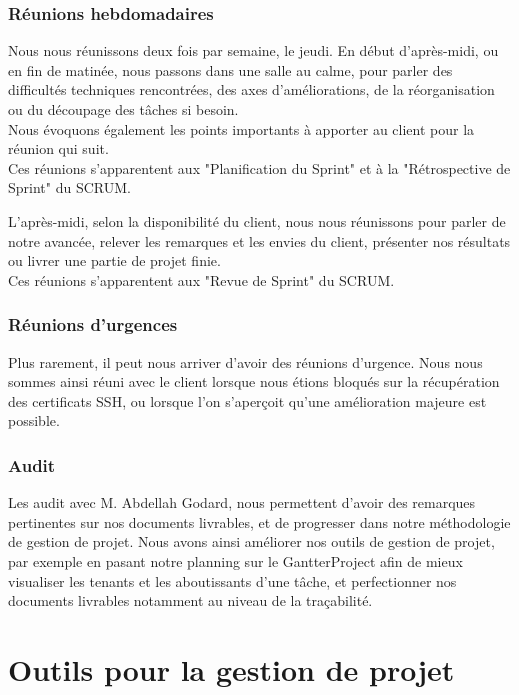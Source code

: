 \subsubsection{Réunions hebdomadaires}

Nous nous réunissons deux fois par semaine, le jeudi.
En début d'après-midi, ou en fin de matinée, nous passons dans une salle au calme, pour parler des difficultés techniques rencontrées, des axes d'améliorations, de la réorganisation ou du découpage des tâches si besoin.\\
Nous évoquons également les points importants à apporter au client pour la réunion qui suit.\\
Ces réunions s'apparentent aux "Planification du Sprint" et à la "Rétrospective de Sprint" du SCRUM.

L'après-midi, selon la disponibilité du client, nous nous réunissons pour parler de notre avancée, relever les remarques et les envies du client, présenter nos résultats ou livrer une partie de projet finie.\\
Ces réunions s'apparentent aux "Revue de Sprint" du SCRUM.

\subsubsection{Réunions d'urgences}

Plus rarement, il peut nous arriver d'avoir des réunions d'urgence. Nous nous sommes ainsi réuni avec le client lorsque nous étions bloqués sur la récupération des certificats SSH, ou lorsque l'on s'aperçoit qu'une amélioration majeure est possible.

\subsubsection{Audit}

Les audit avec M. Abdellah Godard, nous permettent d'avoir des remarques pertinentes sur nos documents livrables, et de progresser dans notre méthodologie de gestion de projet. Nous avons ainsi améliorer nos outils de gestion de projet, par exemple en pasant notre planning sur le GantterProject afin de mieux visualiser les tenants et les aboutissants d'une tâche, et perfectionner nos documents livrables notamment au niveau de la traçabilité.

\section{Outils pour la gestion de projet}


